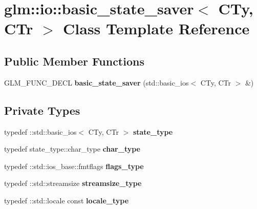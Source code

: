 \hypertarget{classglm_1_1io_1_1basic__state__saver}{}\section{glm\+:\+:io\+:\+:basic\+\_\+state\+\_\+saver$<$ C\+Ty, C\+Tr $>$ Class Template Reference}
\label{classglm_1_1io_1_1basic__state__saver}
\subsection*{Public Member Functions}
\begin{DoxyCompactItemize}
\item 
\mbox{\label{classglm_1_1io_1_1basic__state__saver_ab31652b0b7f2a24fa8f9fda2505de356}} 
G\+L\+M\+\_\+\+F\+U\+N\+C\+\_\+\+D\+E\+CL {\bfseries basic\+\_\+state\+\_\+saver} (std\+::basic\+\_\+ios$<$ C\+Ty, C\+Tr $>$ \&)
\end{DoxyCompactItemize}
\subsection*{Private Types}
\begin{DoxyCompactItemize}
\item 
\mbox{\label{classglm_1_1io_1_1basic__state__saver_a84787cc03192543bfe67ef25e7f20aa6}} 
typedef \+::std\+::basic\+\_\+ios$<$ C\+Ty, C\+Tr $>$ {\bfseries state\+\_\+type}
\item 
\mbox{\label{classglm_1_1io_1_1basic__state__saver_ae6abb8e2e6bd4a044e953746691ffe8e}} 
typedef state\+\_\+type\+::char\+\_\+type {\bfseries char\+\_\+type}
\item 
\mbox{\label{classglm_1_1io_1_1basic__state__saver_a73ca8320543524c7ab7f1ce97d30aff6}} 
typedef \+::std\+::ios\+\_\+base\+::fmtflags {\bfseries flags\+\_\+type}
\item 
\mbox{\label{classglm_1_1io_1_1basic__state__saver_a0a4c44df9a4fcf7531af6da7698e0931}} 
typedef \+::std\+::streamsize {\bfseries streamsize\+\_\+type}
\item 
\mbox{\label{classglm_1_1io_1_1basic__state__saver_acc657f13df9c1fd68e1014b96ff615cb}} 
typedef \+::std\+::locale const {\bfseries locale\+\_\+type}
\end{DoxyCompactItemize}
